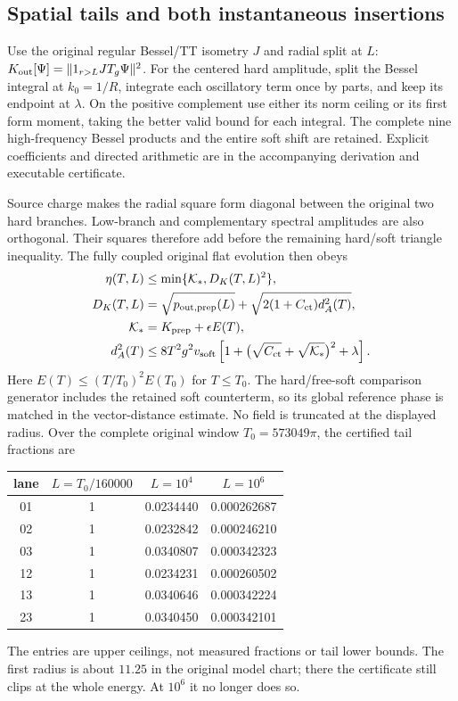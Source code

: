 \documentclass[10pt,twocolumn,letterpaper]{article}
\begin{document}
\subsection{Spatial tails and both instantaneous insertions}
Use the original regular Bessel/TT isometry $J$ and radial split at $L$:
$K_{\rm out}[\Psi]=\|1_{r>L}JT_g\Psi\|^2$.
For the centered hard amplitude, split the Bessel integral at $k_0=1/R$,
integrate each oscillatory term once by parts, and keep its endpoint at
$\lambda$.  On the positive complement use either its norm ceiling or its
first form moment, taking the better valid bound for each integral.
The complete nine high-frequency Bessel products and the entire soft shift
are retained.  Explicit coefficients and directed arithmetic are in the
accompanying derivation and executable certificate.

Source charge makes the radial square form diagonal between the original
two hard branches.  Low-branch and complementary spectral amplitudes are
also orthogonal.  Their squares therefore add before the remaining
hard/soft triangle inequality.  The fully coupled original flat evolution
then obeys
\[
 \begin{split}
 \eta(T,L)&\le\min\{\mathcal K_*,D_K(T,L)^2\},\\
 D_K(T,L)&=\sqrt{p_{\rm out,prep}(L)}
       +\sqrt{2(1+C_{\rm ct})d_A^2(T)},\\
 \mathcal K_*&=K_{\rm prep}+\epsilon E(T),\\
 d_A^2(T)&\le8T^2g^2v_{\rm soft}
    \left[1+\bigl(\sqrt{C_{\rm ct}}+\sqrt{\mathcal K_*}\bigr)^2+\lambda\right].
 \end{split}
\]
Here $E(T)\le(T/T_0)^2E(T_0)$ for $T\le T_0$.
The hard/free-soft comparison generator includes the retained soft
counterterm, so its global reference phase is matched in the vector-distance
estimate.
No field is truncated at the displayed radius.  Over the complete original
window $T_0=573049\pi$, the certified tail fractions are
\begin{center}
\begin{tabular}{c|ccc}
lane & $L=T_0/160000$ & $L=10^4$ & $L=10^6$\\\hline
01&1&0.0234440&0.000262687\\
02&1&0.0232842&0.000246210\\
03&1&0.0340807&0.000342323\\
12&1&0.0234231&0.000260502\\
13&1&0.0340646&0.000342224\\
23&1&0.0340450&0.000342101
\end{tabular}
\end{center}
The entries are upper ceilings, not measured fractions or tail lower
bounds.  The first radius is about $11.25$ in the original model chart;
there the certificate still clips at the whole energy.  At $10^6$ it no
longer does so.
\end{document}
